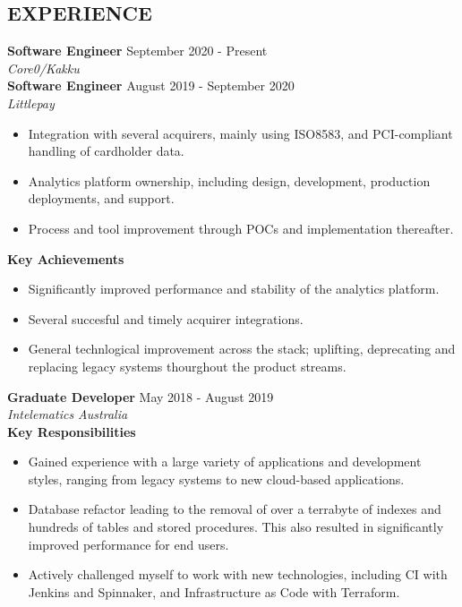 \documentclass[margin, 11pt]{res} %
\begin{document}
\begin{resume}

\section{EXPERIENCE}
\textbf{Software Engineer} \hfill September 2020 - Present \\
{\sl Core0/Kakku}
\vspace{15pt}\\

\textbf{Software Engineer} \hfill August 2019 - September 2020 \\
{\sl Littlepay}

\begin{itemize}
\item Integration with several acquirers, mainly using ISO8583, and PCI-compliant handling of cardholder data.
\item Analytics platform ownership, including design, development, production deployments, and support.
\item Process and tool improvement through POCs and implementation thereafter.

\end{itemize}


\textbf{Key Achievements}

\begin{itemize}
\item Significantly improved performance and stability of the analytics platform.
\item Several succesful and timely acquirer integrations.
\item General technlogical improvement across the stack; uplifting, deprecating and replacing legacy systems thourghout the product streams.

\end{itemize}


\textbf{Graduate Developer} \hfill May 2018 - August 2019 \\
{\sl Intelematics Australia}
\vspace{15pt}\\
\textbf{Key Responsibilities}

\begin{itemize}
\item Gained experience with a large variety of applications and development styles, ranging from legacy systems to new cloud-based applications.
\item Database refactor leading to the removal of over a terrabyte of indexes and hundreds of tables and stored procedures. This also resulted in significantly improved performance for end users.
\item Actively challenged myself to work with new technologies, including CI with Jenkins and Spinnaker, and Infrastructure as Code with Terraform.


\end{itemize}
\end{resume}
\end{document}
